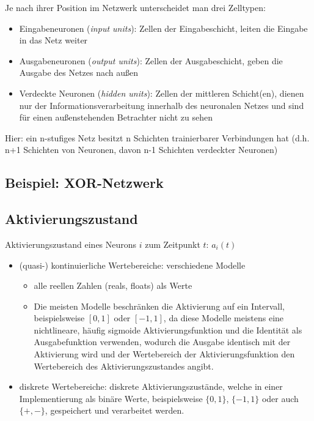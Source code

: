 \noindent
Je nach ihrer Position im Netzwerk unterscheidet man drei Zelltypen:
\begin{itemize}[noitemsep]
\item Eingabeneuronen (\textit{input units}): Zellen der Eingabeschicht, leiten die Eingabe in das Netz weiter
\item Ausgabeneuronen (\textit{output units}): Zellen der Ausgabeschicht, geben die Ausgabe des Netzes nach außen
\item Verdeckte Neuronen (\textit{hidden units}): Zellen der mittleren Schicht(en), dienen nur der Informationsverarbeitung innerhalb des neuronalen Netzes und sind für einen
außenstehenden Betrachter nicht zu sehen
\end{itemize}

Hier: ein n-stufiges Netz besitzt n Schichten trainierbarer Verbindungen hat (d.h. n+1 Schichten von Neuronen, davon n-1 Schichten verdeckter Neuronen)

\subsection*{Beispiel: XOR-Netzwerk}
\subsection*{Aktivierungszustand}
Aktivierungszustand eines Neurons $i$ zum Zeitpunkt $t$: $a_i(t)$ 
\begin{itemize}
\item (quasi-) kontinuierliche Wertebereiche: verschiedene Modelle 
\begin{itemize}
\item alle reellen Zahlen (reals, floats) als Werte
\item Die meisten Modelle beschränken die Aktivierung auf ein
Intervall, beispielsweise $[0, 1]$ oder $[-1, 1]$, da diese Modelle
meistens eine nichtlineare, häufig sigmoide Aktivierungsfunktion und die Identität
als Ausgabefunktion verwenden, wodurch die Ausgabe identisch mit der
Aktivierung wird und der Wertebereich der Aktivierungsfunktion den Wertebereich
des Aktivierungszustandes angibt.
\end{itemize}
\item diskrete Wertebereiche: diskrete Aktivierungszustände, welche in einer Implementierung als binäre Werte, beispielsweise $\{0, 1\}$, $\{-1, 1\}$ oder auch $\{+, -\}$, gespeichert und verarbeitet werden.
\end{itemize}

